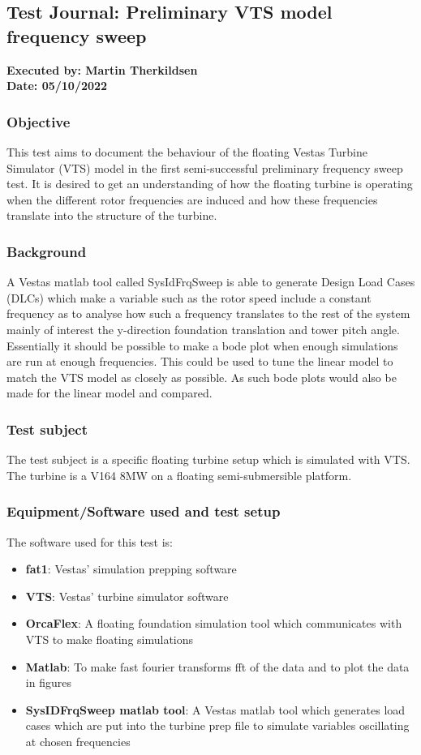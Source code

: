 \subsection{Test Journal: Preliminary VTS model frequency sweep} \label{app:tj_00}

\textbf{Executed by: Martin Therkildsen} \\
\textbf{Date: 05/10/2022}

\subsubsection*{Objective}
This test aims to document the behaviour of the floating Vestas Turbine Simulator (VTS) model in the first semi-successful preliminary frequency sweep test. It is desired to get an understanding of how the floating turbine is operating when the different rotor frequencies are induced and how these frequencies translate into the structure of the turbine. 

\subsubsection*{Background}
A Vestas matlab tool called SysIdFrqSweep is able to generate Design Load Cases (DLCs) which make a variable such as the rotor speed include a constant frequency as to analyse how such a frequency translates to the rest of the system mainly of interest the y-direction foundation translation and tower pitch angle. Essentially it should be possible to make a bode plot when enough simulations are run at enough frequencies. This could be used to tune the linear model to match the VTS model as closely as possible. As such bode plots would also be made for the linear model and compared.

\subsubsection*{Test subject}
The test subject is a specific floating turbine setup which is simulated with VTS. The turbine is a V164 8MW on a floating semi-submersible platform.

\subsubsection*{Equipment/Software used and test setup}
The software used for this test is:
\begin{itemize}
	\item \textbf{fat1}: Vestas' simulation prepping software
	\item \textbf{VTS}: Vestas' turbine simulator software
	\item \textbf{OrcaFlex}: A floating foundation simulation tool which communicates with VTS to make floating simulations
	\item \textbf{Matlab}: To make fast fourier transforms fft of the data and to plot the data in figures
	\item \textbf{SysIDFrqSweep matlab tool}: A Vestas matlab tool which generates load cases which are put into the turbine prep file to simulate variables oscillating at chosen frequencies
\end{itemize}


